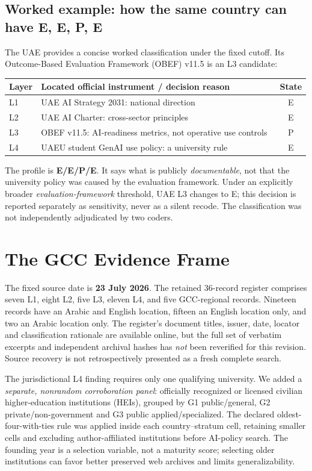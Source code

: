 \documentclass[conference,letterpaper]{IEEEtran}
\begin{document}
\subsection{Worked example: how the same country can have E, E, P, E}
The UAE provides a concise worked classification under the fixed cutoff. Its Outcome-Based Evaluation Framework (OBEF) v11.5 is an L3 candidate:
\begin{center}
\small\setlength{\tabcolsep}{4pt}
\begin{tabularx}{\columnwidth}{@{}p{}Xc@{}}
\toprule
Layer & Located official instrument / decision reason & State\\\midrule
L1 & UAE AI Strategy 2031: national direction~\cite{uaestrategy} & E\\
L2 & UAE AI Charter: cross-sector principles~\cite{uaecharter} & E\\
L3 & OBEF v11.5: AI-readiness metrics, not operative use controls~\cite{obef} & P\\
L4 & UAEU student GenAI use policy: a university rule~\cite{uaeupolicy} & E\\\bottomrule
\end{tabularx}
\end{center}
The profile is \textbf{E/E/P/E}. It says what is publicly \emph{documentable}, not that the university policy was caused by the evaluation framework. Under an explicitly broader \emph{evaluation-framework} threshold, UAE L3 changes to E; this decision is reported separately as sensitivity, never as a silent recode. The classification was not independently adjudicated by two coders.

\section{The GCC Evidence Frame}
The fixed source date is \textbf{23 July 2026}. The retained 36-record register comprises seven L1, eight L2, five L3, eleven L4, and five GCC-regional records. Nineteen records have an Arabic and English location, fifteen an English location only, and two an Arabic location only. The register's document titles, issuer, date, locator and classification rationale are available online, but the full set of verbatim excerpts and independent archival hashes has \emph{not} been reverified for this revision. Source recovery is not retrospectively presented as a fresh complete search.

The jurisdictional L4 finding requires only one qualifying university. We added a \emph{separate, nonrandom corroboration panel}: officially recognized or licensed civilian higher-education institutions (HEIs), grouped by G1 public/general, G2 private/non-government and G3 public applied/specialized. The declared oldest-four-with-ties rule was applied inside each country--stratum cell, retaining smaller cells and excluding author-affiliated institutions before AI-policy search. The founding year is a selection variable, not a maturity score; selecting older institutions can favor better preserved web archives and limits generalizability.
\end{document}
